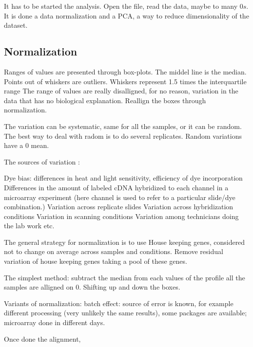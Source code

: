 It has to be started the analysis. Open the file, read the data, maybe to many $ 0s $. It is done a data normalization and a PCA, a way to reduce dimensionality of the dataset. 

\subsection{Normalization}
Ranges of values are presented through box-plots. The middel line is the median. Points out of whiskers are outliers. Whiskers represent 1.5 times the interquartile range %
The range of values are really disalligned, for no reason, variation in the data that has no biological explanation. Reallign the boxes through normalization.

The variation can be systematic, same for all the samples, or it can be random. The best way to deal with radom is to do several replicates. Random variations have a 0 mean. 

The sources of variation :

Dye bias: differences in heat and light sensitivity, efficiency of
dye incorporation
Differences in the amount of labeled cDNA hybridized to each
channel in a microarray experiment (here channel is used to
refer to a particular slide/dye combination.)
Variation across replicate slides
Variation across hybridization conditions
Variation in scanning conditions
Variation among technicians doing the lab work
etc.

The general strategy for normalization is to use
House keeping genes,
considered not to change on average across samples and
conditions. Remove residual variation of house keeping genes taking a pool of these genes.

The simplest method: subtract the median from each values of the profile \Rightarrow all the samples are alligned on  $ 0 $. Shifting up and down the boxes. 

Variants of normalization: batch effect: source of error is known, for example different processing (very unlikely the same results), some packages are available; microarray done in different days.

Once done the alignment, 


















